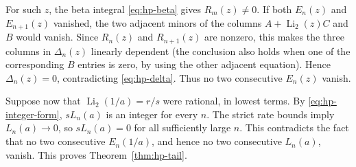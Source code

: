 For such $z$, the beta integral \eqref{eq:hp-beta} gives $R_m(z)\ne0$.
If both $E_n(z)$ and $E_{n+1}(z)$ vanished, the two adjacent minors of the
columns $A+\operatorname{Li}_2(z)C$ and $B$ would vanish.  Since
$R_n(z)$ and $R_{n+1}(z)$ are nonzero, this makes the three columns in
$\Delta_n(z)$ linearly dependent (the conclusion also holds when one of the
corresponding $B$ entries is zero, by using the other adjacent equation).
Hence $\Delta_n(z)=0$, contradicting \eqref{eq:hp-delta}.  Thus no two
consecutive $E_n(z)$ vanish.

Suppose now that $\operatorname{Li}_2(1/a)=r/s$ were rational, in lowest
terms.  By \eqref{eq:hp-integer-form}, $sL_n(a)$ is an integer for every
$n$.  The strict rate bounds imply $L_n(a)\to0$, so $sL_n(a)=0$ for all
sufficiently large $n$.  This contradicts the fact that no two consecutive
$E_n(1/a)$, and hence no two consecutive $L_n(a)$, vanish.  This proves
Theorem~\ref{thm:hp-tail}.
